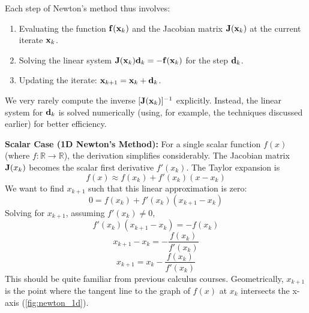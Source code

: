 Each step of Newton's method thus involves:
\begin{enumerate}
    \item Evaluating the function $\mathbf{f}(\mathbf{x}_k)$ and the Jacobian matrix $\mathbf{J}(\mathbf{x}_k)$ at the current iterate $\mathbf{x}_k$.
    \item Solving the linear system $\mathbf{J}(\mathbf{x}_k)\mathbf{d}_k = -\mathbf{f}(\mathbf{x}_k)$ for the step $\mathbf{d}_k$.
    \item Updating the iterate: $\mathbf{x}_{k+1} = \mathbf{x}_k + \mathbf{d}_k$.
\end{enumerate}
We very rarely compute the inverse $[\mathbf{J}(\mathbf{x}_k)]^{-1}$ explicitly. Instead, the linear system for $\mathbf{d}_k$ is solved numerically (using, for example, the techniques discussed earlier) for better efficiency.

\textbf{Scalar Case (1D Newton's Method):}
For a single scalar function $f(x)$ (where $f:\mathbb{R}\to\mathbb{R}$), the derivation simplifies considerably. The Jacobian matrix $\mathbf{J}(x_k)$ becomes the scalar first derivative $f'(x_k)$. The Taylor expansion is
\begin{equation}
    f(x) \approx f(x_k) + f'(x_k)(x - x_k)
\end{equation}
We want to find $x_{k+1}$ such that this linear approximation is zero:
\begin{equation}
    0 = f(x_k) + f'(x_k)(x_{k+1} - x_k)
\end{equation}
Solving for $x_{k+1}$, assuming $f'(x_k) \neq 0$,
\begin{equation}
    f'(x_k)(x_{k+1} - x_k) = -f(x_k)
\end{equation}
\begin{equation}
    x_{k+1} - x_k = -\frac{f(x_k)}{f'(x_k)}
\end{equation}
\begin{equation}
    x_{k+1} = x_k - \frac{f(x_k)}{f'(x_k)}
\end{equation}
This should be quite familiar from previous calculus courses. Geometrically, $x_{k+1}$ is the point where the tangent line to the graph of $f(x)$ at $x_k$ intersects the x-axis (\autoref{fig:newton_1d}).

